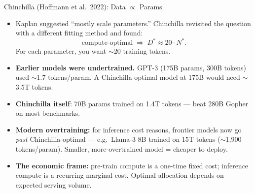 \begin{frame}{Chinchilla (Hoffmann et al.\ 2022): Data $\propto$ Params}
\begin{itemize}
\item Kaplan suggested ``mostly scale parameters.'' Chinchilla revisited the question with a different fitting method and found:
\[
   \text{compute-optimal} \;\Longrightarrow\; D^* \approx 20 \cdot N^*.
\]
For each parameter, you want $\sim$20 training tokens.

\medskip
\item \textbf{Earlier models were undertrained.} GPT-3 (175B params, 300B tokens) used $\sim$$1.7$ tokens/param. A Chinchilla-optimal model at 175B would need $\sim$3.5T tokens.

\medskip
\item \textbf{Chinchilla itself}: 70B params trained on 1.4T tokens --- beat 280B Gopher on most benchmarks.

\medskip
\item \textbf{Modern overtraining:} for inference cost reasons, frontier models now go \emph{past} Chinchilla-optimal --- e.g.\ Llama-3 8B trained on 15T tokens ($\sim$1{,}900 tokens/param). Smaller, more-overtrained model = cheaper to deploy.

\medskip
\item \textbf{The economic frame:} pre-train compute is a one-time fixed cost; inference compute is a recurring marginal cost. Optimal allocation depends on expected serving volume.
\end{itemize}
\end{frame}


